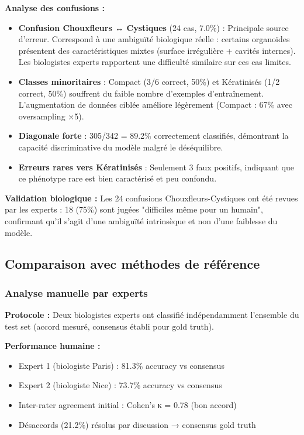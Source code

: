 \textbf{Analyse des confusions :}
\begin{itemize}
    \item \textbf{Confusion Chouxfleurs ↔ Cystiques} (24 cas, 7.0\%) : Principale source d'erreur. Correspond à une ambiguïté biologique réelle : certains organoïdes présentent des caractéristiques mixtes (surface irrégulière + cavités internes). Les biologistes experts rapportent une difficulté similaire sur ces cas limites.
    
    \item \textbf{Classes minoritaires} : Compact (3/6 correct, 50\%) et Kératinisés (1/2 correct, 50\%) souffrent du faible nombre d'exemples d'entraînement. L'augmentation de données ciblée améliore légèrement (Compact : 67\% avec oversampling ×5).
    
    \item \textbf{Diagonale forte} : 305/342 = 89.2\% correctement classifiés, démontrant la capacité discriminative du modèle malgré le déséquilibre.
    
    \item \textbf{Erreurs rares vers Kératinisés} : Seulement 3 faux positifs, indiquant que ce phénotype rare est bien caractérisé et peu confondu.
\end{itemize}

\textbf{Validation biologique :}
Les 24 confusions Chouxfleurs-Cystiques ont été revues par les experts : 18 (75\%) sont jugées "difficiles même pour un humain", confirmant qu'il s'agit d'une ambiguïté intrinsèque et non d'une faiblesse du modèle.

\subsection{Comparaison avec méthodes de référence}

\subsubsection{Analyse manuelle par experts}

\textbf{Protocole :}
Deux biologistes experts ont classifié indépendamment l'ensemble du test set (accord mesuré, consensus établi pour gold truth).

\textbf{Performance humaine :}
\begin{itemize}
    \item Expert 1 (biologiste Paris) : 81.3\% accuracy vs consensus
    \item Expert 2 (biologiste Nice) : 73.7\% accuracy vs consensus
    \item Inter-rater agreement initial : Cohen's κ = 0.78 (bon accord)
    \item Désaccords (21.2\%) résolus par discussion → consensus gold truth
\end{itemize}

